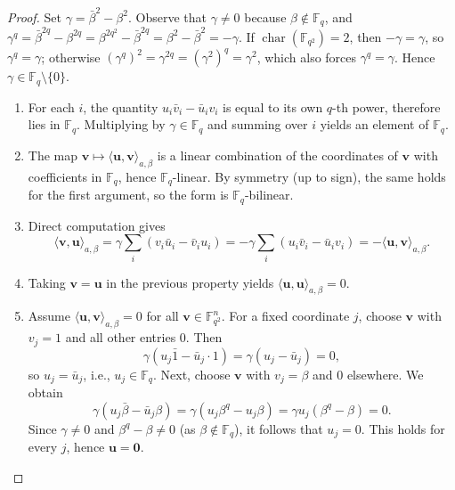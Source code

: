 \documentclass{aims}
\numberwithin{equation}{section}
\theoremstyle{definition}
\newcommand{\F}{\mathbb{F}}
\begin{document}
\begin{proof}
	Set $\gamma = \bar{\beta}^2 - \beta^2$. Observe that $\gamma \neq 0$ because $\beta \notin \F_q$, and $\gamma^q = \bar{\beta}^{2q} - \beta^{2q} = \beta^{2q^2} - \bar{\beta}^{2q} = \beta^{2} - \bar{\beta}^{2} = -\gamma$. If $\operatorname{char}(\F_{q^2}) = 2$, then $-\gamma = \gamma$, so $\gamma^q = \gamma$; otherwise $(\gamma^q)^2 = \gamma^{2q} = (\gamma^2)^q = \gamma^2$, which also forces $\gamma^q = \gamma$. Hence $\gamma \in \F_q \setminus \{0\}$.
	
	\begin{enumerate}
		\item For each $i$, the quantity $u_i\bar{v}_i - \bar{u}_i v_i$ is equal to its own $q$-th power, therefore lies in $\F_q$. Multiplying by $\gamma \in \F_q$ and summing over $i$ yields an element of $\F_q$.
		
		\item The map $\pmb{v} \mapsto \langle \pmb{u}, \pmb{v} \rangle_{a,\beta}$ is a linear combination of the coordinates of $\pmb{v}$ with coefficients in $\F_q$, hence $\F_q$-linear. By symmetry (up to sign), the same holds for the first argument, so the form is $\F_q$-bilinear.
		
		\item Direct computation gives
		\[
		\langle \pmb{v}, \pmb{u} \rangle_{a,\beta} = \gamma \sum_i (v_i\bar{u}_i - \bar{v}_i u_i) = -\gamma \sum_i (u_i\bar{v}_i - \bar{u}_i v_i) = -\langle \pmb{u}, \pmb{v} \rangle_{a,\beta}.
		\]
		
		\item Taking $\pmb{v} = \pmb{u}$ in the previous property yields $\langle \pmb{u}, \pmb{u} \rangle_{a,\beta} = 0$.
		
		\item Assume $\langle \pmb{u}, \pmb{v} \rangle_{a,\beta} = 0$ for all $\pmb{v} \in \F_{q^2}^n$. For a fixed coordinate $j$, choose $\pmb{v}$ with $v_j = 1$ and all other entries $0$. Then
		\[
		\gamma (u_j \bar{1} - \bar{u}_j \cdot 1) = \gamma (u_j - \bar{u}_j) = 0,
		\]
		so $u_j = \bar{u}_j$, i.e., $u_j \in \F_q$. Next, choose $\pmb{v}$ with $v_j = \beta$ and $0$ elsewhere. We obtain
		\[
		\gamma (u_j \bar{\beta} - \bar{u}_j \beta) = \gamma (u_j \beta^q - u_j \beta) = \gamma u_j (\beta^q - \beta) = 0.
		\]
		Since $\gamma \neq 0$ and $\beta^q - \beta \neq 0$ (as $\beta \notin \F_q$), it follows that $u_j = 0$. This holds for every $j$, hence $\pmb{u} = \mathbf{0}$.
	\end{enumerate}
\end{proof}
\end{document}
